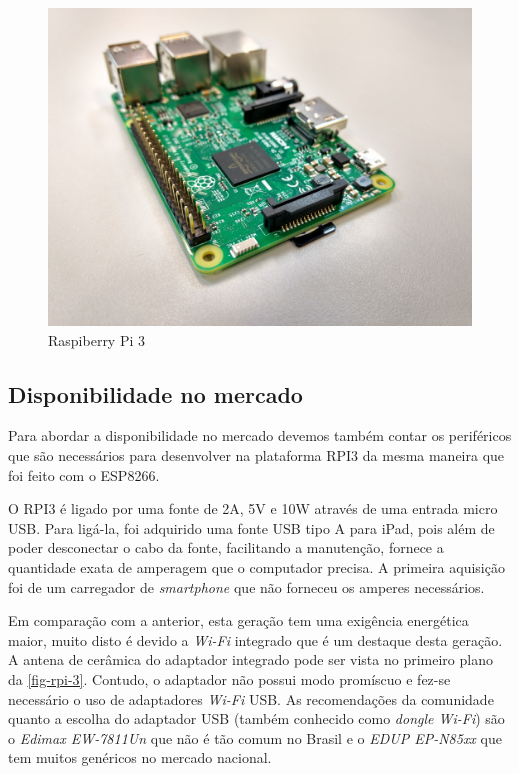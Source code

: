 \begin{figure}[htb]
	\caption{\label{fig-rpi-3}Raspiberry Pi 3 }
	\begin{center}
		\includegraphics[width=1\textwidth]{040-plataformas/RPi-WiFi-dongles/rpi-onboard.jpg}
	\end{center}
\end{figure}



\subsection{Disponibilidade no mercado}
\label{subsec:mercado-esp}

Para abordar a disponibilidade no mercado devemos também contar os periféricos
que são necessários para desenvolver na plataforma  RPI3 da mesma maneira que
foi feito com o ESP8266.

O RPI3 é ligado por uma fonte de 2A, 5V e 10W através de uma entrada micro
USB. Para ligá-la, foi adquirido uma fonte USB tipo A para iPad, pois além de
poder desconectar o cabo da fonte, facilitando a manutenção, fornece a
quantidade exata de amperagem que o computador precisa. A primeira aquisição foi
de um carregador de \emph{smartphone} que não forneceu os amperes necessários.

Em comparação com a anterior, esta geração  tem uma exigência energética maior,
muito disto é devido a \emph{Wi-Fi} integrado que é um destaque desta geração.
A antena de cerâmica do adaptador integrado pode ser vista no primeiro plano da
\autoref{fig-rpi-3}. Contudo, o adaptador não possui modo promíscuo e fez-se
necessário o uso de adaptadores \emph{Wi-Fi} USB. As recomendações da comunidade
quanto a escolha do adaptador USB (também conhecido como \emph{dongle Wi-Fi})
são o \emph{Edimax EW-7811Un} que não é tão comum no Brasil e o
\emph{EDUP EP-N85xx} que tem muitos genéricos no mercado nacional.

